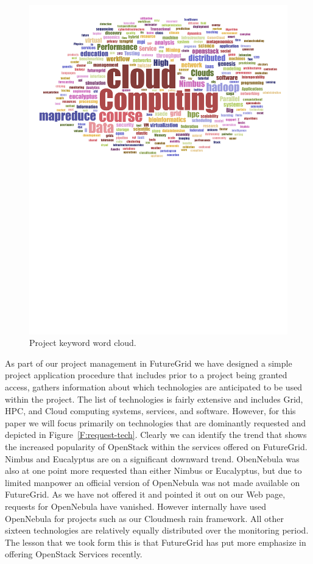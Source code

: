 \documentclass{article}
\begin{document}
\begin{figure}[p]
\begin{minipage}[t]{1.0\textwidth}
  \centering
    \includegraphics[width=1.0\textwidth]{images/fg-keyword-wordcloud.pdf}
  \caption{Project keyword word cloud.}\label{F:keycloud}
\end{minipage}
\end{figure}




As part of our project management in FutureGrid we have designed a simple project application procedure that includes prior to a project being granted access, gathers information about which technologies are anticipated to be used within the project. The list of technologies is fairly extensive and includes Grid, HPC, and Cloud computing systems, services, and software. However, for this paper we will focus primarily on technologies that are dominantly requested and depicted in Figure~\ref{F:request-tech}. Clearly we can identify the trend that shows the increased popularity of OpenStack within the services offered on FutureGrid. Nimbus and Eucalyptus are on a significant downward trend. ObenNebula was also at one point more requested than either Nimbus or Eucalyptus, but due to limited manpower an official version of OpenNebula was not made available on FutureGrid. As we have not offered it and pointed it out on our Web page, requests for OpenNebula have vanished.  However internally have used OpenNebula for projects such as our Cloudmesh rain framework. All other sixteen technologies are relatively equally distributed over the monitoring period. The lesson that we took form this is that FutureGrid has put more emphasize in offering OpenStack Services recently.
\end{document}

